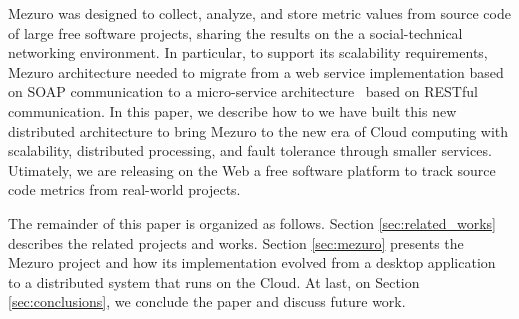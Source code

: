 Mezuro was designed to collect, analyze, and store metric values from source
code of large free software projects, sharing the results on the a
social-technical networking environment. In particular, to support its
scalability requirements, Mezuro architecture needed to migrate from a web
service implementation based on SOAP communication to a micro-service
architecture~\cite{namiot2014micro} based on RESTful communication. In this
paper, we describe how to we have built this new distributed architecture to
bring Mezuro to the new era of Cloud computing with scalability, distributed
processing, and fault tolerance through smaller services. Utimately, we are
releasing on the Web a free software platform to track source code metrics from
real-world projects.

The remainder of this paper is organized as follows. Section
\ref{sec:related_works} describes the related projects and works. Section
\ref{sec:mezuro} presents the Mezuro project and how its implementation evolved
from a desktop application to a distributed system that runs on the Cloud. At
last, on Section \ref{sec:conclusions}, we conclude the paper and discuss
future work.
